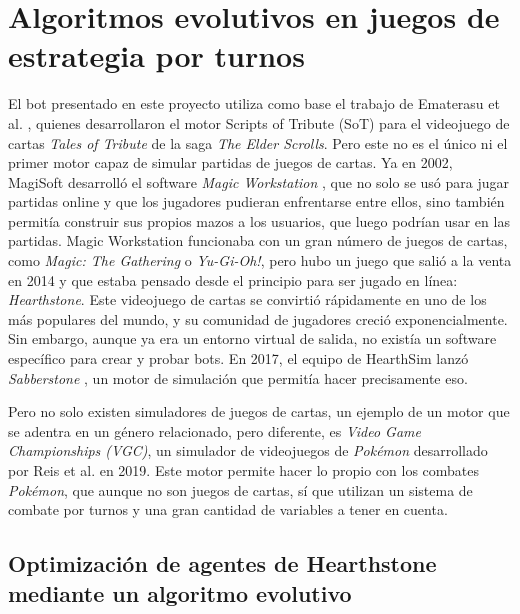 \section{Algoritmos evolutivos en juegos de estrategia por turnos} \label{sec:trabajos_relacionados}

El bot presentado en este proyecto utiliza como base el trabajo de Ematerasu et al. \cite{ematerasu_scriptsoftribute_2022}, quienes desarrollaron el motor Scripts of Tribute (SoT) para el videojuego de cartas \textit{Tales of Tribute} de la saga \textit{The Elder Scrolls}. Pero este no es el único ni el primer motor capaz de simular partidas de juegos de cartas. Ya en 2002, MagiSoft desarrolló el software \textit{Magic Workstation} \cite{magi-soft_development_magic_2002}, que no solo se usó para jugar partidas online y que los jugadores pudieran enfrentarse entre ellos, sino también permitía construir sus propios mazos a los usuarios, que luego podrían usar en las partidas. Magic Workstation funcionaba con un gran número de juegos de cartas, como \textit{Magic: The Gathering} o \textit{Yu-Gi-Oh!}, pero hubo un juego que salió a la venta en 2014 y que estaba pensado desde el principio para ser jugado en línea: \textit{Hearthstone}. Este videojuego de cartas se convirtió rápidamente en uno de los más populares del mundo, y su comunidad de jugadores creció exponencialmente. Sin embargo, aunque ya era un entorno virtual de salida, no existía un software específico para crear y probar bots. En 2017, el equipo de HearthSim lanzó \textit{Sabberstone} \cite{hearthsim_hearthsimsabberstone_2017}, un motor de simulación que permitía hacer precisamente eso.

Pero no solo existen simuladores de juegos de cartas, un ejemplo de un motor que se adentra en un género relacionado, pero diferente, es \textit{Video Game Championships (VGC)}, un simulador de videojuegos de \textit{Pokémon} desarrollado por Reis et al. \cite{simao_reis_vgc_2019} en 2019. Este motor permite hacer lo propio con los combates \textit{Pokémon}, que aunque no son juegos de cartas, sí que utilizan un sistema de combate por turnos y una gran cantidad de variables a tener en cuenta.


\subsection{Optimización de agentes de Hearthstone mediante un algoritmo evolutivo}

